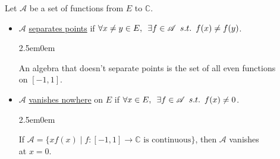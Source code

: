 \documentclass{book}
\newcommand{\exOne}{%
   \color{Purple}%
   \fontsize{14}{16}\selectfont%
}
\newenvironment{myIndent}{%
   \begin{adjustwidth}{2.5em}{0em}%
}{%
   \end{adjustwidth}%
}
\newcommand{\udefine}[1]{{%
   \setulcolor{Red}%
   \setul{0.14em}{0.07em}%
   \ul{#1}%
}}
\newcommand{\suchthat}{ \hspace{0.5em}s.t.\hspace{0.5em}}
\newcommand{\myHS}{ \hspace{0.5em}}
\newcommand{\retTwo}{\hfill\bigbreak}
\begin{document}
Let $\mathscr{A}$ be a set of functions from $E$ to $\mathbb{C}$.\\ [-22pt]
\begin{itemize}
   \item[\hphantom{.}] $\mathscr{A}$ \udefine{separates points} if $\forall x \neq y \in E, \myHS \exists f \in \mathscr{A} \suchthat f(x) \neq f(y)$.
   {\begin{myIndent}\exOne
      An algebra that doesn't separate points is the set of all even functions\\ on $[-1, 1]$.\retTwo
   \end{myIndent}}
   \item[\hphantom{.}] $\mathscr{A}$ \udefine{vanishes nowhere} on $E$ if $\forall x \in E,\myHS \exists f \in \mathscr{A} \suchthat f(x) \neq 0$.
   {\begin{myIndent}\exOne
      If $\mathscr{A} = \{xf(x) \mid f: [-1, 1] \longrightarrow \mathbb{C} \text{ is continuous}\}$, then $\mathscr{A}$ vanishes\\ at $x = 0$.\retTwo
   \end{myIndent}}
\end{itemize}
\end{document}
